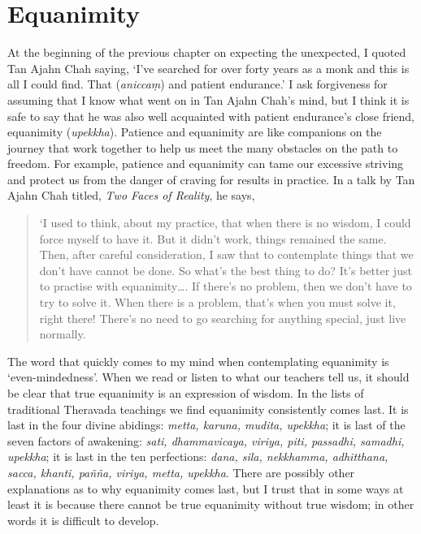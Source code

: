 \section{Equanimity}

\enlargethispage{\baselineskip}

At the beginning of the previous chapter on expecting the unexpected, I
quoted Tan Ajahn Chah saying, `I've searched for over forty years as a
monk and this is all I could find. That (\emph{aniccaṃ}) and patient
endurance.' I ask forgiveness for assuming that I know what went on in
Tan Ajahn Chah's mind, but I think it is safe to say that he was also
well acquainted with patient endurance's close friend, equanimity
(\emph{upekkha}). Patience and equanimity are like companions on the
journey that work together to help us meet the many obstacles on the
path to freedom. For example, patience and equanimity can tame our
excessive striving and protect us from the danger of craving for results
in practice. In a talk by Tan Ajahn Chah titled, \emph{Two Faces of
Reality}, he says,

\begin{quotation}
`I used to think, about my practice, that when there is no wisdom, I
could force myself to have it. But it didn't work, things remained the
same. Then, after careful consideration, I saw that to contemplate
things that we don't have cannot be done. So what's the best thing to
do? It's better just to practise with equanimity\ldots{}. If there's no
problem, then we don't have to try to solve it. When there is a problem,
that's when you must solve it, right there! There's no need to go
searching for anything special, just live normally.

\end{quotation}

\enlargethispage{\baselineskip}

The word that quickly comes to my mind when contemplating equanimity is
`even-mindedness'. When we read or listen to what our teachers tell us,
it should be clear that true equanimity is an expression of wisdom. In
the lists of traditional Theravada teachings we find equanimity
consistently comes last. It is last in the four divine abidings:
\emph{metta, karuna, mudita, upekkha}; it is last of the seven factors
of awakening: \emph{sati, dhammavicaya, viriya, piti, passadhi, samadhi,
upekkha}; it is last in the ten perfections: \emph{dana, sila,
nekkhamma, adhitthana, sacca, khanti, pañña, viriya, metta, upekkha}.
There are possibly other explanations as to why equanimity comes last,
but I trust that in some ways at least it is because there cannot be
true equanimity without true wisdom; in other words it is difficult to
develop.

